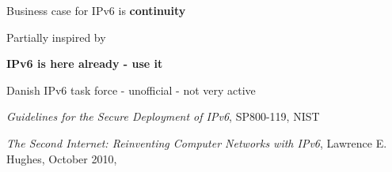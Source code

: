 \documentclass[28pt,landscape,a4paper,footrule]{foils}
\begin{document}
\centerline{ Business case for IPv6 is {\bf continuity}}


{\footnotesize Partially inspired by }




\begin{center}
\vskip 5mm
{\color{titlecolor}\LARGE \bf IPv6 is here already - use it}
\vskip 5mm


\vskip 1cm
\centerline{ Danish IPv6 task force - unofficial - not very active}

\end{center}



\myquestionspage



\begin{list1}
\item \emph{Guidelines for the Secure Deployment of IPv6}, SP800-119, NIST\\
\item \emph{The Second Internet: Reinventing Computer Networks with IPv6}, Lawrence E. Hughes, October 2010,\\ 
\end{list1}






\hlkprofiluk
\end{document}
